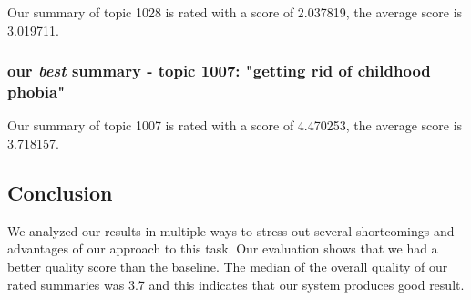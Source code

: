Our summary of topic 1028 is rated with a score of 2.037819, the average score is 3.019711.

\vspace{1em}
\subsubsection*{our \emph{best} summary - topic 1007: "getting rid of childhood phobia"}

Our summary of topic 1007 is rated with a score of 4.470253, the average score is 3.718157.

\subsection{Conclusion}

We analyzed our results in multiple ways to stress out several shortcomings and advantages of our approach to this task. Our evaluation shows that we had a better quality score than the baseline. The median of the overall quality of our rated summaries was 3.7 and this indicates that our system produces good result.